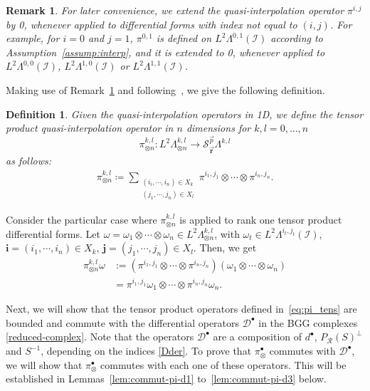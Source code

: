 \documentclass[final]{amsart}%
\newtheorem{remark}{Remark}
\newtheorem{definition}{Definition}
\newcommand{\charset}{X}
\newcommand{\0}{\mathaccent23}
\newcommand\ran{\mathcal{R}}
\newcommand{\bs}{{\scriptscriptstyle \bullet}}
\newcommand{\vbr}{\vec{\mathbf r}}
\newcommand{\vp}{\vec{p}}
\begin{document}
\begin{remark}
\label{rem:pi_ext}
For later convenience, we extend the quasi-interpolation operator $\pi^{i, j}$ by 0, whenever applied to differential forms with index not equal to $(i,j)$. For example, for $i=0$ and $j=1$, $\pi^{0, 1}$ is defined on $L^{2}\Lambda^{0, 1}(\mathcal{I})$ according to Assumption~\ref{assump:interp}, and it is extended to 0, whenever applied to $L^{2}\Lambda^{0, 0}(\mathcal{I})$, $L^{2}\Lambda^{1, 0}(\mathcal{I})$ or $L^{2}\Lambda^{1, 1}(\mathcal{I})$.
\end{remark}

Making use of Remark~\ref{rem:pi_ext} and following~\cite{bonizzoni2021h}, we give the following definition.
\begin{definition}
Given the quasi-interpolation operators in 1D, we define the tensor product quasi-interpolation operator in $n$ dimensions for $k,l=0,\ldots,n$  
$$
\pi^{k,l}_{\otimes n}\colon L^{2}\Lambda^{k, l}_{\otimes n}\to \mathscr{S}^{\vp}_{\vbr}\Lambda^{k, l}
$$ 
as follows:
\begin{gather}
\label{eq:pi_tens}
    \pi^{k,l}_{\otimes n} \coloneqq 
    \sum_{\substack{(i_{i}, \cdots, i_{n})\in \charset_{k}\\ (j_{1}, \cdots, j_{n})\in \charset_{l}}} \pi^{i_1,j_1}\otimes\cdots\otimes \pi^{i_n,j_n}.
\end{gather}
\end{definition}

Consider the particular case where $\pi_{\otimes n}^{k, l}$ is applied to rank one tensor product differential forms. Let $\omega=\omega_{1}\otimes \cdots\otimes \omega_{n}\in L^2\Lambda^{k,l}_{\otimes n}$, with $\omega_{t}\in L^{2}\Lambda^{i_{t}, j_{t}}(\mathcal{I})$, $\bm i=(i_1, \cdots, i_n)\in X_k$, $\bm j=(j_1, \cdots, j_n)\in X_l$. Then, we get
\begin{align*}
\pi_{\otimes n}^{k, l}\omega
&:=(\pi^{i_{1}, j_{1}}\otimes \cdots \otimes \pi^{i_{n}, j_{n}})(\omega_{1}\otimes\cdots\otimes \omega_{n})\\
&=\pi^{i_{1}, j_{1}}\omega_{1}\otimes \cdots \otimes \pi^{i_{n}, j_{n}}\omega_{n}.
\end{align*}

Next, we will show that the tensor product operators defined in~\eqref{eq:pi_tens} are bounded and commute with the differential operators $\mathscr{D}^\bs$ in the BGG complexes \eqref{reduced-complex}. Note that the operators $\mathscr{D}^\bs$ are a composition of $d^\bs$, $P_\ran(S)^\perp$ and $S^{-1}$, depending on the indices \eqref{Dder}. To prove that $\pi_\otimes^\bs$ commutes with $\mathscr{D}^\bs$, we will show that $\pi_\otimes^\bs$ commutes with each one of these operators. 
This will be established in Lemmas~\ref{lem:commut-pi-d1} to~\ref{lem:commut-pi-d3} below.
\end{document}
